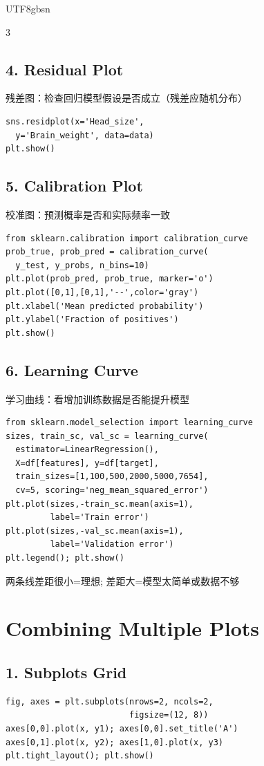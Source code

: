 \documentclass[9pt,landscape,a4paper]{article}
\newcommand{\zhint}[1]{{\scriptsize\color{gray!70!black}#1}}
\begin{document}
\begin{CJK}{UTF8}{gbsn}
\begin{multicols}{3}
\subsection{4. Residual Plot}
\zhint{残差图：检查回归模型假设是否成立（残差应随机分布）}
\begin{lstlisting}
sns.residplot(x='Head_size',
  y='Brain_weight', data=data)
plt.show()
\end{lstlisting}

\subsection{5. Calibration Plot}
\zhint{校准图：预测概率是否和实际频率一致}
\begin{lstlisting}
from sklearn.calibration import calibration_curve
prob_true, prob_pred = calibration_curve(
  y_test, y_probs, n_bins=10)
plt.plot(prob_pred, prob_true, marker='o')
plt.plot([0,1],[0,1],'--',color='gray')
plt.xlabel('Mean predicted probability')
plt.ylabel('Fraction of positives')
plt.show()
\end{lstlisting}

\subsection{6. Learning Curve}
\zhint{学习曲线：看增加训练数据是否能提升模型}
\begin{lstlisting}
from sklearn.model_selection import learning_curve
sizes, train_sc, val_sc = learning_curve(
  estimator=LinearRegression(),
  X=df[features], y=df[target],
  train_sizes=[1,100,500,2000,5000,7654],
  cv=5, scoring='neg_mean_squared_error')
plt.plot(sizes,-train_sc.mean(axis=1),
         label='Train error')
plt.plot(sizes,-val_sc.mean(axis=1),
         label='Validation error')
plt.legend(); plt.show()
\end{lstlisting}
\zhint{两条线差距很小=理想; 差距大=模型太简单或数据不够}

\section{Combining Multiple Plots}

\subsection{1. Subplots Grid}
\begin{lstlisting}
fig, axes = plt.subplots(nrows=2, ncols=2,
                         figsize=(12, 8))
axes[0,0].plot(x, y1); axes[0,0].set_title('A')
axes[0,1].plot(x, y2); axes[1,0].plot(x, y3)
plt.tight_layout(); plt.show()
\end{lstlisting}


\end{multicols}
\end{CJK}
\end{document}
